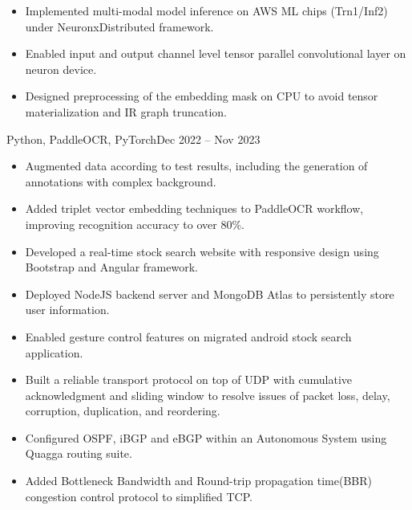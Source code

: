\documentclass[10pt,a4paper]{altacv}
\begin{document}
\begin{itemize}
	\item Implemented multi-modal model inference on AWS  ML chips (Trn1/Inf2) under NeuronxDistributed framework.
	\item Enabled input and output channel level tensor parallel convolutional layer on neuron device.
	\item Designed preprocessing of the embedding mask on CPU to avoid tensor materialization and IR graph truncation.
\end{itemize}

 {Python, PaddleOCR, PyTorch}{Dec 2022 -- Nov 2023}
\begin{itemize}
	\item Augmented data according to test results, including the generation of annotations with complex background.
	\item Added triplet vector embedding techniques to PaddleOCR workflow, improving recognition accuracy to over 80\%.
\end{itemize}



\begin{itemize}
	\item Developed a real-time stock search website with responsive design using Bootstrap and Angular framework. \href{http://stock-env.eba-etbgm9hj.us-west-1.elasticbeanstalk.com/search/home}{\faExternalLink}
	\item Deployed NodeJS backend server and MongoDB Atlas to persistently store user information.
	\item Enabled gesture control features on migrated android stock search application.
\end{itemize}

\begin{itemize}
	\item Built a reliable transport protocol on top of UDP with cumulative acknowledgment and sliding window to resolve issues of packet loss, delay, corruption, duplication, and reordering.
	\item Configured OSPF, iBGP and eBGP within an Autonomous System using Quagga routing suite.
	\item Added Bottleneck Bandwidth and Round-trip propagation time(BBR) congestion control protocol to simplified TCP.
\end{itemize}
\end{document}
